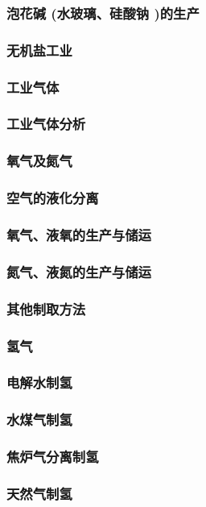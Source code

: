\documentclass[UTF8]{../../ApplicationUniverse}
\begin{document}
    \subsubsection{泡花碱 (水玻璃、硅酸钠 )的生产}
\subsubsection{无机盐工业}
\subsubsection{工业气体}
    \subsubsection{工业气体分析}
    \subsubsection{氧气及氮气}
        \subsubsection{空气的液化分离}
        \subsubsection{氧气、液氧的生产与储运}
        \subsubsection{氮气、液氮的生产与储运}
        \subsubsection{其他制取方法}
    \subsubsection{氢气}
        \subsubsection{电解水制氢}
        \subsubsection{水煤气制氢}
        \subsubsection{焦炉气分离制氢}
        \subsubsection{天然气制氢}
\end{document}
